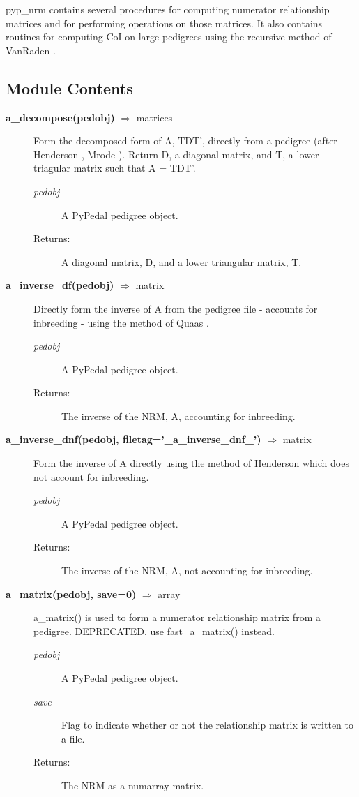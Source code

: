 pyp\_nrm contains several procedures for computing numerator relationship matrices and for performing operations on those matrices. It also contains routines for computing CoI on large pedigrees using the recursive method of VanRaden \cite{VanRaden1992a}.

\subsection*{Module Contents}

\begin{description}
\item[\textbf{a\_decompose(pedobj)} $\Rightarrow$ matrices] 
Form the decomposed form of A, TDT', directly from a pedigree (after Henderson \cite{ref143}, Mrode \cite{ref224}). Return D, a diagonal matrix, and T, a lower triagular matrix such that A = TDT'.
\begin{description}
\item[\emph{pedobj}] A PyPedal pedigree object.
\item[Returns:] A diagonal matrix, D, and a lower triangular matrix, T.
\end{description}

\item[\textbf{a\_inverse\_df(pedobj)} $\Rightarrow$ matrix] 
Directly form the inverse of A from the pedigree file - accounts for inbreeding - using the method of Quaas \cite{ref235}.
\begin{description}
\item[\emph{pedobj}] A PyPedal pedigree object.
\item[Returns:] The inverse of the NRM, A, accounting for inbreeding.
\end{description}

\item[\textbf{a\_inverse\_dnf(pedobj, filetag='\_a\_inverse\_dnf\_')} $\Rightarrow$ matrix] 
Form the inverse of A directly using the method of Henderson \cite{ref143} which does not account for inbreeding.
\begin{description}
\item[\emph{pedobj}] A PyPedal pedigree object.
\item[Returns:] The inverse of the NRM, A, not accounting for inbreeding.
\end{description}

\item[\textbf{a\_matrix(pedobj, save=0)} $\Rightarrow$ array] 
a\_matrix() is used to form a numerator relationship matrix from a pedigree. DEPRECATED. use fast\_a\_matrix() instead.
\begin{description}
\item[\emph{pedobj}] A PyPedal pedigree object.
\item[\emph{save}] Flag to indicate whether or not the relationship matrix is written to a file.
\item[Returns:] The NRM as a numarray matrix.
\end{description}


\end{description}
